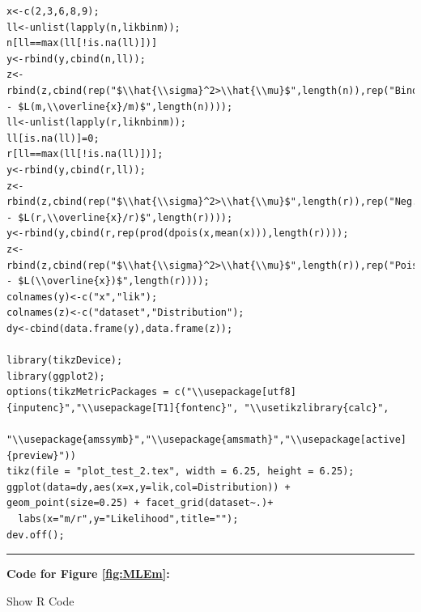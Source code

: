\documentclass[]{book}
\theoremstyle{definition}
\theoremstyle{definition}
\theoremstyle{definition}
\theoremstyle{remark}
\begin{document}
\begin{verbatim}
x<-c(2,3,6,8,9);
ll<-unlist(lapply(n,likbinm));
n[ll==max(ll[!is.na(ll)])]
y<-rbind(y,cbind(n,ll));
z<-rbind(z,cbind(rep("$\\hat{\\sigma}^2>\\hat{\\mu}$",length(n)),rep("Binomial - $L(m,\\overline{x}/m)$",length(n))));
ll<-unlist(lapply(r,liknbinm));
ll[is.na(ll)]=0;
r[ll==max(ll[!is.na(ll)])];
y<-rbind(y,cbind(r,ll));
z<-rbind(z,cbind(rep("$\\hat{\\sigma}^2>\\hat{\\mu}$",length(r)),rep("Neg.binomial - $L(r,\\overline{x}/r)$",length(r))));
y<-rbind(y,cbind(r,rep(prod(dpois(x,mean(x))),length(r))));
z<-rbind(z,cbind(rep("$\\hat{\\sigma}^2>\\hat{\\mu}$",length(r)),rep("Poisson - $L(\\overline{x})$",length(r))));
colnames(y)<-c("x","lik");
colnames(z)<-c("dataset","Distribution");
dy<-cbind(data.frame(y),data.frame(z));

library(tikzDevice);
library(ggplot2);
options(tikzMetricPackages = c("\\usepackage[utf8]{inputenc}","\\usepackage[T1]{fontenc}", "\\usetikzlibrary{calc}",
                               "\\usepackage{amssymb}","\\usepackage{amsmath}","\\usepackage[active]{preview}"))
tikz(file = "plot_test_2.tex", width = 6.25, height = 6.25);
ggplot(data=dy,aes(x=x,y=lik,col=Distribution)) + geom_point(size=0.25) + facet_grid(dataset~.)+
  labs(x="m/r",y="Likelihood",title="");
dev.off();
\end{verbatim}

\begin{center}\rule{0.5\linewidth}{\linethickness}\end{center}

\textbf{Code for Figure \ref{fig:MLEm}:}

Show R Code
\end{document}
